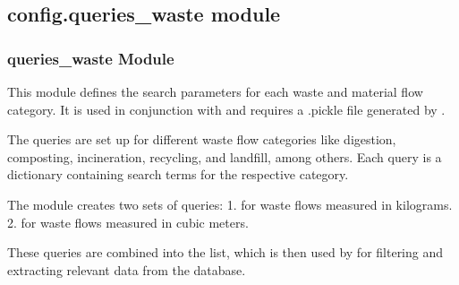 \documentclass[letterpaper,10pt,english]{sphinxmanual}
\begin{document}
\begin{sphinxVerbatim}[commandchars=\\\{\}]
 
       
         


\end{sphinxVerbatim}


\subsection{config.queries\_waste module}
\label{\detokenize{configuration_api:module-config.queries_waste}}\label{\detokenize{configuration_api:config-queries-waste-module}}

\subsubsection{queries\_waste Module}
\label{\detokenize{configuration_api:queries-waste-module}}
\sphinxAtStartPar
This module defines the search parameters for each waste and material flow category. It is used in conjunction with  and requires a .pickle file generated by .

\sphinxAtStartPar
The queries are set up for different waste flow categories like digestion, composting, incineration, recycling, and landfill, among others. Each query is a dictionary containing search terms for the respective category.

\sphinxAtStartPar
The module creates two sets of queries:
1.  for waste flows measured in kilograms.
2.  for waste flows measured in cubic meters.

\sphinxAtStartPar
These queries are combined into the  list, which is then used by  for filtering and extracting relevant data from the database.
\end{document}
